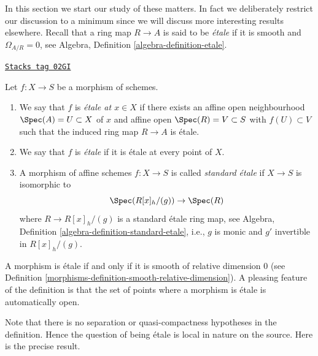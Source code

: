 \medskip\noindent
In this section we start our study of these matters. In fact we deliberately
restrict our discussion to a minimum since we will discuss more interesting
results elsewhere. Recall that a ring map $R \to A$ is said to be {\it \'etale}
if it is smooth and $\Omega_{A/R} = 0$, see
Algebra, Definition \ref{algebra-definition-etale}.

\begin{definition}[Etale]
\label{morphisms-definition-etale}
\href{https://stacks.math.columbia.edu/tag/02GI}{\texttt{Stacks tag 02GI}}

Let $f : X \to S$ be a morphism of schemes.
\begin{enumerate}
\item We say that $f$ is {\it \'etale at $x \in X$} if
there exists an affine open neighbourhood $\Spec(A) = U \subset X$
of $x$ and affine open $\Spec(R) = V \subset S$
with $f(U) \subset V$ such that the induced ring map
$R \to A$ is \'etale.
\item We say that $f$ is {\it \'etale} if it is \'etale at every point of $X$.
\item A morphism of affine schemes $f : X \to S$ is called
{\it standard \'etale} if $X \to S$ is isomorphic to
$$
\Spec(R[x]_h/(g)) \to \Spec(R)
$$
where $R \to R[x]_h/(g)$ is a standard \'etale ring map, see
Algebra, Definition \ref{algebra-definition-standard-etale},
i.e., $g$ is monic and $g'$ invertible in $R[x]_h/(g)$.
\end{enumerate}
\end{definition}

A morphism is \'etale if and only if it is smooth of relative dimension $0$
(see Definition \ref{morphisms-definition-smooth-relative-dimension}).
A pleasing feature of the definition is that the set of points
where a morphism is \'etale is automatically open.

\medskip\noindent
Note that there is no separation or quasi-compactness hypotheses in the
definition. Hence the question of being \'etale is local in nature on
the source. Here is the precise result.

